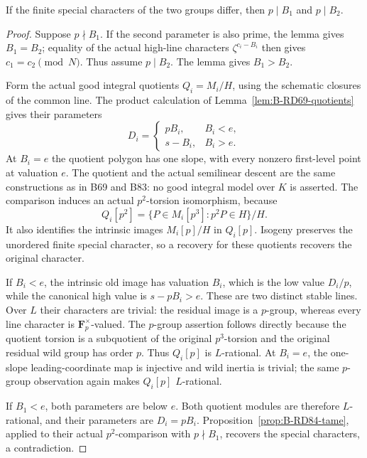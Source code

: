 \begin{proposition}
\label{prop:B-RD91-divisibility}
If the finite special characters of the two groups differ, then
\(p\mid B_1\) and \(p\mid B_2\).
\end{proposition}
\begin{proof}
Suppose \(p\nmid B_1\). If the second parameter is also prime,
the lemma gives \(B_1=B_2\); equality of the actual high-line
characters \(\zeta^{c_i-B_i}\) then gives \(c_1=c_2\pmod N\).
Thus assume \(p\mid B_2\). The lemma gives \(B_1>B_2\).

Form the actual good integral quotients \(Q_i=M_i/H\), using
the schematic closures of the common line. The product calculation
of Lemma~\ref{lem:B-RD69-quotients} gives their parameters
\[
 D_i=\begin{cases}
       pB_i,&B_i<e,\\
       s-B_i,&B_i>e.
      \end{cases}                                    \tag{B-RD91.4}
\]
At \(B_i=e\) the quotient polygon has one slope, with every
nonzero first-level point at valuation \(e\). The quotient and
the actual semilinear descent are the same constructions as in
B69 and B83: no good integral model over \(K\) is asserted.
The comparison induces an actual \(p^2\)-torsion isomorphism,
because
\[
 Q_i[p^2]=\{P\in M_i[p^3]:p^2P\in H\}/H.           \tag{B-RD91.5}
\]
It also identifies the intrinsic images \(M_i[p]/H\) in
\(Q_i[p]\). Isogeny preserves the unordered finite special
character, so a recovery for these quotients recovers the original
character.

If \(B_i<e\), the intrinsic old image has valuation \(B_i\),
which is the low value \(D_i/p\), while the canonical high value
is \(s-pB_i>e\). These are two distinct stable lines. Over \(L\)
their characters are trivial: the residual image is a \(p\)-group,
whereas every line character is \(\mathbf F_p^\times\)-valued.
The \(p\)-group assertion follows directly because the quotient
torsion is a subquotient of the original \(p^3\)-torsion and the
original residual wild group has order \(p\). Thus \(Q_i[p]\)
is \(L\)-rational. At \(B_i=e\), the one-slope leading-coordinate
map is injective and wild inertia is trivial; the same \(p\)-group
observation again makes \(Q_i[p]\) \(L\)-rational.

If \(B_1<e\), both parameters are below \(e\). Both quotient
modules are therefore \(L\)-rational, and their parameters are
\(D_i=pB_i\). Proposition~\ref{prop:B-RD84-tame}, applied to
their actual \(p^2\)-comparison with \(p\nmid B_1\), recovers
the special characters, a contradiction.


\end{proof}
